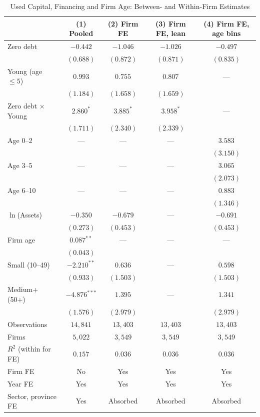 \begin{table}[H]
\centering
\caption{Used Capital, Financing and Firm Age: Between- and Within-Firm Estimates}
\label{tab:emp_firmfe}
\begin{tabular}{lcccc}
\toprule
 & (1) Pooled & (2) Firm FE & (3) Firm FE, lean & (4) Firm FE, age bins \\
\midrule
Zero debt & $-0.442$ & $-1.046$ & $-1.026$ & $-0.497$ \\
 & $(0.688)$ & $(0.872)$ & $(0.871)$ & $(0.835)$ \\
Young (age $\le 5$) & $0.993$ & $0.755$ & $0.807$ & --- \\
 & $(1.184)$ & $(1.658)$ & $(1.659)$ &  \\
Zero debt $\times$ Young & $2.860^{*}$ & $3.885^{*}$ & $3.958^{*}$ & --- \\
 & $(1.711)$ & $(2.340)$ & $(2.339)$ &  \\
Age 0--2 & --- & --- & --- & $3.583$ \\
 &  &  &  & $(3.150)$ \\
Age 3--5 & --- & --- & --- & $3.065$ \\
 &  &  &  & $(2.073)$ \\
Age 6--10 & --- & --- & --- & $0.883$ \\
 &  &  &  & $(1.346)$ \\
$\ln$(Assets) & $-0.350$ & $-0.679$ & --- & $-0.691$ \\
 & $(0.273)$ & $(0.453)$ &  & $(0.453)$ \\
Firm age & $0.087^{**}$ & --- & --- & --- \\
 & $(0.043)$ &  &  &  \\
Small (10--49) & $-2.210^{**}$ & $0.636$ & --- & $0.598$ \\
 & $(0.933)$ & $(1.503)$ &  & $(1.503)$ \\
Medium+ (50+) & $-4.876^{***}$ & $1.395$ & --- & $1.341$ \\
 & $(1.576)$ & $(2.979)$ &  & $(2.979)$ \\
\addlinespace
Observations & $14{,}841$ & $13{,}403$ & $13{,}403$ & $13{,}403$ \\
Firms & $5{,}022$ & $3{,}549$ & $3{,}549$ & $3{,}549$ \\
$R^2$ (within for FE) & $0.157$ & $0.036$ & $0.036$ & $0.036$ \\
Firm FE & No & Yes & Yes & Yes \\
Year FE & Yes & Yes & Yes & Yes \\
Sector, province FE & Yes & Absorbed & Absorbed & Absorbed \\
\bottomrule
\end{tabular}
\end{table}
